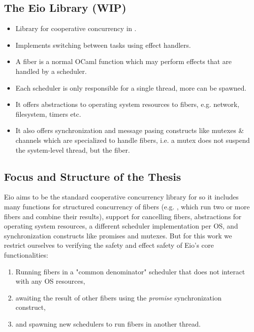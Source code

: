 \subsection{The Eio Library (WIP)}
\label{sec:intro-eio}

\begin{itemize}
    \item Library for cooperative concurrency in \ocf{}.
    \item Implements switching between tasks using effect handlers.
    \item A fiber is a normal OCaml function which may perform effects that are handled by a scheduler.
    \item Each scheduler is only responsible for a single thread, more can be spawned.
    \item It offers abstractions to operating system resources to fibers, e.g. network, filesystem, timers etc.
    \item It also offers synchronization and message pasing constructs like mutexes \& channels which are specialized to handle fibers, i.e. a mutex does not suspend the system-level thread, but the fiber.
\end{itemize}

\subsection{Focus and Structure of the Thesis}
\label{sec:intro-structure}

Eio aims to be the standard cooperative concurrency library for \ocf{} so it includes many functions for structured concurrency of fibers (e.g. , which run two or more fibers and combine their results), support for cancelling fibers, abstractions for operating system resources, a different scheduler implementation per OS, and synchronization constructs like promises and mutexes.
But for this work we restrict ourselves to verifying the safety and effect safety of Eio's core functionalities:
\begin{enumerate}
    \item Running fibers in a "common denominator" scheduler that does not interact with any OS resources,
    \item awaiting the result of other fibers using the \textit{promise} synchronization construct,
    \item and spawning new schedulers to run fibers in another thread.
\end{enumerate}

